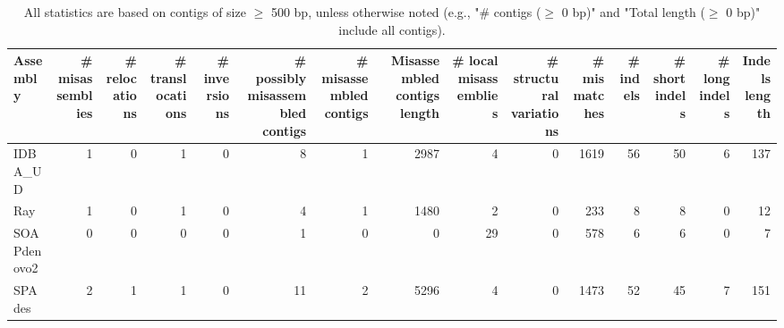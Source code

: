 \documentclass[12pt,a4paper]{article}
\begin{document}
\begin{table}[ht]
\begin{center}
\caption{All statistics are based on contigs of size $\geq$ 500 bp, unless otherwise noted (e.g., "\# contigs ($\geq$ 0 bp)" and "Total length ($\geq$ 0 bp)" include all contigs).}
\begin{tabular}{|l*{14}{|r}|}
\hline
Assembly & \# misassemblies &     \# relocations &     \# translocations &     \# inversions & \# possibly misassembled contigs & \# misassembled contigs & Misassembled contigs length & \# local misassemblies & \# structural variations & \# mismatches & \# indels &     \# short indels &     \# long indels & Indels length \\ \hline
IDBA\_UD & 1 & 0 & 1 & 0 & 8 & 1 & 2987 & 4 & 0 & 1619 & 56 & 50 & 6 & 137 \\ \hline
Ray & 1 & 0 & 1 & 0 & 4 & 1 & 1480 & 2 & 0 & 233 & 8 & 8 & 0 & 12 \\ \hline
SOAPdenovo2 & 0 & 0 & 0 & 0 & 1 & 0 & 0 & 29 & 0 & 578 & 6 & 6 & 0 & 7 \\ \hline
SPAdes & 2 & 1 & 1 & 0 & 11 & 2 & 5296 & 4 & 0 & 1473 & 52 & 45 & 7 & 151 \\ \hline
\end{tabular}
\end{center}
\end{table}
\end{document}
